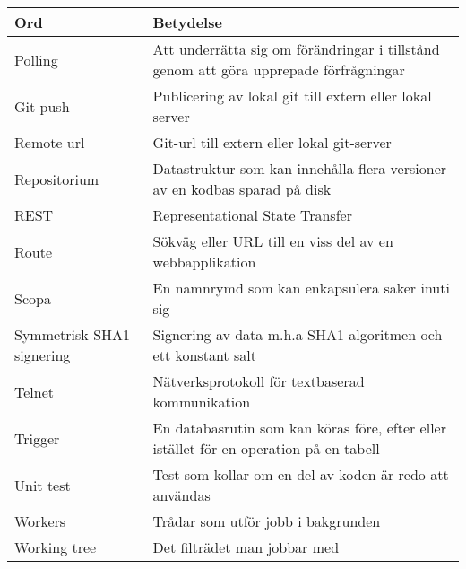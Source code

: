 \begin{tabular} { | l | p{10cm} | }
\hline
\bf{Ord} & \bf{Betydelse} \\
\hline
Polling & Att underrätta sig om förändringar i tillstånd genom att göra upprepade förfrågningar \\
\hline
Git push & Publicering av lokal git till extern eller lokal server \\
\hline
Remote url & Git-url till extern eller lokal git-server \\
\hline
Repositorium & Datastruktur som kan innehålla flera versioner av en kodbas sparad på disk \\
\hline
REST & Representational State Transfer \\
\hline
Route & Sökväg eller URL till en viss del av en webbapplikation \\
\hline
Scopa & En namnrymd som kan enkapsulera saker inuti sig \\
\hline
Symmetrisk SHA1-signering & Signering av data m.h.a SHA1-algoritmen och ett konstant salt \\
\hline
Telnet & Nätverksprotokoll för textbaserad kommunikation \\
\hline
Trigger & En databasrutin som kan köras före, efter eller istället för en operation på en tabell  \\
\hline
Unit test & Test som kollar om en del av koden är redo att användas \\
\hline
Workers & Trådar som utför jobb i bakgrunden \\
\hline
Working tree & Det filträdet man jobbar med \\
\hline
\end{tabular}
\normalsize

